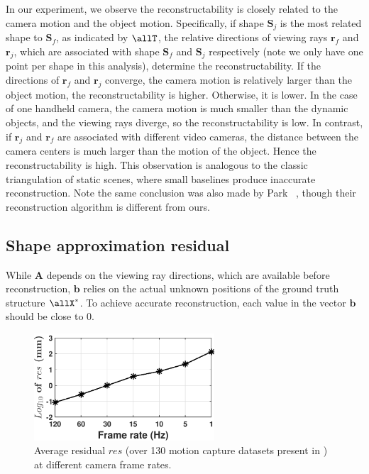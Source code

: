 In our experiment, we observe the reconstructability is closely related to the camera motion and the object motion. 
Specifically, if shape $\mathbf{S}_j$ is the most related shape to $\mathbf{S}_f$, as indicated by $\allT$, the relative directions of viewing rays $\mathbf{r}_f$ and $\mathbf{r}_j$, which are associated with shape $\mathbf{S}_f$ and $\mathbf{S}_j$ respectively (note we only have one point per shape in this analysis), determine the reconstructability. If the directions of $\mathbf{r}_f$ and $\mathbf{r}_j$ converge, \ie the camera motion is relatively larger than the object motion, the reconstructability is higher. Otherwise, it is lower. 
In the case of one handheld camera, the camera motion is much smaller than the dynamic objects,  and the viewing rays diverge, so the reconstructability is low. In contrast, if $\mathbf{r}_j$ and $\mathbf{r}_f$ are associated with different video cameras, the distance between the camera centers is much larger than the motion of the object. Hence the reconstructability is high.
This observation is analogous to the classic triangulation of static scenes, where small baselines produce inaccurate reconstruction. Note the same conclusion was also made by Park \etal~\cite{park20153d}, though their reconstruction algorithm is different from ours.



\subsection{Shape approximation residual} \label{sec:shape_approximation}
While $\mathbf{A}$ depends on the viewing ray directions, which are available before reconstruction, $\mathbf{b}$ relies on the actual unknown positions of the ground truth structure $\allX^*$. To achieve accurate reconstruction, each value in the vector $\mathbf{b}$ should be close to 0. 

\begin{figure}
\centering
\includegraphics[width=0.60\textwidth]{chapter5/resource/residual.pdf}
\caption{Average residual $res$ (over 130 motion capture datasets present in \cite{cg-2007-2}) at different camera frame rates.}
\label{fig:residual}
\end{figure}

